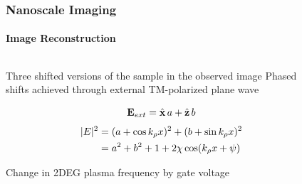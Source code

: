 \documentclass[mathserif,16pt,xcolor=table]{beamer}
\begin{document}
      \begin{frame}
        \frametitle{Nanoscale Imaging}
        \framesubtitle{Image Reconstruction}
        \begin{columns}[T] %
          \begin{column}{.5\textwidth}
            \begin{outline}[itemize]
              \1 Three shifted versions of the sample in the observed image
              \1 Phased shifts achieved through external TM-polarized plane wave
            \end{outline}
            \begin{equation} \nonumber
              \v E_{ext} = \^{ \v{x}} \, a  +  \^{ \v{z}} \, b
              \label{eq:TM_pole}%
            \end{equation}
            \begin{equation} \nonumber
              \begin{split}
                \vert E \vert^2 &= (a + \cos k_{\rho}x)^2 + (b + \sin k_{\rho}x)^2 \\
                &=  a^2 + b^2 + 1 + 2 \chi \cos(k_{\rho}x + \psi)
              \end{split}
              \label{eq:shift}
            \end{equation}
            \begin{outline}[itemize]
              \1 Change in 2DEG plasma frequency by gate voltage
            \end{outline}

          \end{column}
          \begin{column}[T]{.5\textwidth}
            \vspace*{-2cm}
            \centering
            \begin{figure}

            \end{figure}
          \end{column}
        \end{columns}
      \end{frame}
\end{document}
